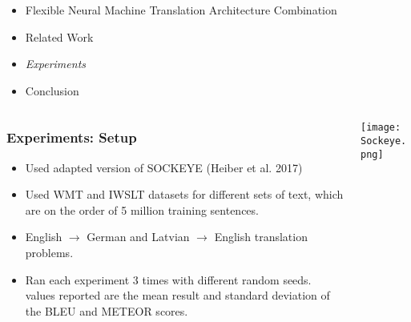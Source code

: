 \begin{frame}

\begin{itemize}
    \item Flexible Neural Machine Translation Architecture Combination
    \item Related Work
    \item \emph{\color{UOYellow}Experiments}
    \item Conclusion
\end{itemize}

\end{frame}

\begin{frame}
    \begin{columns}
        \begin{column}{0.55\paperwidth}
            \frametitle{Experiments: Setup}
            \begin{itemize}
                \item Used adapted version of SOCKEYE (Heiber et al. 2017)
                \item Used WMT and IWSLT datasets for different sets of text, which are
                    on the order of 5 million training sentences.
                \item English $\rightarrow$ German and Latvian $\rightarrow$ English
                    translation problems.
                \item Ran each experiment 3 times with different random seeds. values
                    reported are the mean result and standard deviation of the BLEU and
                    METEOR scores.
            \end{itemize}
        \end{column}
        \begin{column}{0.4\paperwidth}
            \texttt{[image: Sockeye.png]}
        \end{column}
    \end{columns}
\end{frame}


